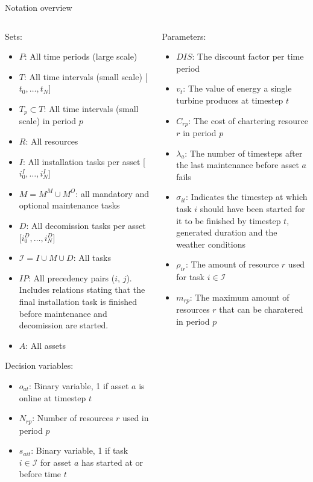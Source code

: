 \documentclass{beamer}
\begin{document}
\begin{frame}{Notation overview}
\tiny

\begin{columns}
\begin{column}{.48\textwidth}
Sets:
\begin{itemize}
\item $P$: All time periods (large scale)
\item $T$: All time intervals (small scale) [$t_0, \dots , t_N$]
\item $T_p \subset T$: All time intervals (small scale) in period $p$
\item $R$: All resources
\item $I$: All installation tasks per asset [$i^I_0, \dots , i^I_N$]
\item $M = M^M \cup M^O$: all mandatory and optional maintenance tasks
\item $D$: All decomission tasks per asset [$i^D_0, \dots , i^D_N$]
\item $\mathcal{I} = I \cup M \cup D$: All tasks
\item $IP$: All precedency pairs ($i$, $j$). Includes relations stating that the final installation task is finished before maintenance and decomission are started. 
\item $A$: All assets
\end{itemize}

Decision variables:
\begin{itemize}
\item $o_{at}$: Binary variable, 1 if asset $a$ is online at timestep $t$
\item $N_{rp}$: Number of resources $r$ used in period $p$
\item $s_{ait}$: Binary variable, 1 if task $i \in \mathcal{I}$ for asset $a$ has started at or before time $t$
\end{itemize}
\end{column}

\hfill

\begin{column}{.48\textwidth}
Parameters:
\begin{itemize}
\item $DIS$: The discount factor per time period
\item $v_t$: The value of energy a single turbine produces at timestep $t$
\item $C_{rp}$: The cost of chartering resource $r$ in period $p$
\item $\lambda_a$: The number of timesteps after the last maintenance before asset $a$ fails
\item $\sigma_{it}$: Indicates the timestep at which task $i$ should have been started for it to be finished by timestep $t$, generated duration and the weather conditions
\item $\rho_{ir}$: The amount of resource $r$ used for task $i \in \mathcal{I}$
\item $m_{rp}$: The maximum amount of resources $r$ that can be charatered in period $p$
\end{itemize}
\end{column}
\end{columns}


\end{frame}
\end{document}
